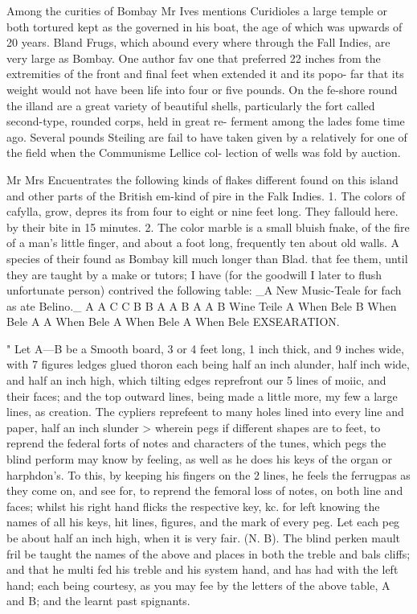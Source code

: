 \documentclass{article}
\begin{document}
Among the curities of Bombay Mr Ives mentions Curidioles
a large temple or both tortured kept as the governed in his
boat, the age of which was upwards of 20 years. Bland
Frugs, which abound every where through the Fall
Indies, are very large as Bombay. One author fav
one that preferred 22 inches from the extremities of
the front and final feet when extended it and its popo-
far that its weight would not have been life into four
or five pounds. On the fe-shore round the illand are
a great variety of beautiful shells, particularly the fort
called second-type, rounded corps, held in great re-
ferment among the lades fome time ago. Several pounds
Steiling are fail to have taken given by a relatively for
one of the field when the Communisme Lellice col-
lection of wells was fold by auction.

Mr Mrs Encuentrates the following kinds of flakes different
found on this island and other parts of the British em-kind of
pire in the Falk Indies. 1. The colors of cafylla, grow, depres
its from four to eight or nine feet long. They fallould here.
by their bite in 15 minutes. 2. The color marble is
a small bluish fnake, of the fire of a man's little finger,
and about a foot long, frequently ten about old walls.
A species of their found as Bombay kill much longer
than Blad. that fee them, until they are taught by a make or tutors; I have (for the goodwill I later to flush unfortunate person) contrived the following table: \_A New Music-Teale for fach as ate Belino.\_ A
A
C
C
B
B
A
A
B
A
A
B
Wine Teile
A
When Bele
B
When Bele
A
A
When Bele
A
When Bele
A
When Bele EXSEARATION.

" Let A—B be a Smooth board, 3 or 4 feet long, 1 inch thick, and 9 inches wide, with 7 figures ledges glued thoron each being half an inch alunder, half inch wide, and half an inch high, which tilting edges reprefront our 5 lines of moiic, and their faces; and the top outward lines, being made a little more, my few a large lines, as creation. The cypliers reprefeent to many holes lined into every line and paper, half an inch slunder > wherein pegs if different shapes are to feet, to reprend the federal forts of notes and characters of the tunes, which pegs the blind perform may know by feeling, as well as he does his keys of the organ or harphdon’s. To this, by keeping his fingers on the 2 lines, he feels the ferrugpas as they come on, and see for, to reprend the femoral loss of notes, on both line and faces; whilst his right hand flicks the respective key, kc. for left knowing the names of all his keys, hit lines, figures, and the mark of every peg. Let each peg be about half an inch high, when it is very fair. (N. B). The blind perken mault fril be taught the names of the above and places in both the treble and bals cliffs; and that he multi fed his treble and his system hand, and has had with the left hand; each being courtesy, as you may fee by the letters of the above table, A and B; and the learnt past spignants.
\end{document}
